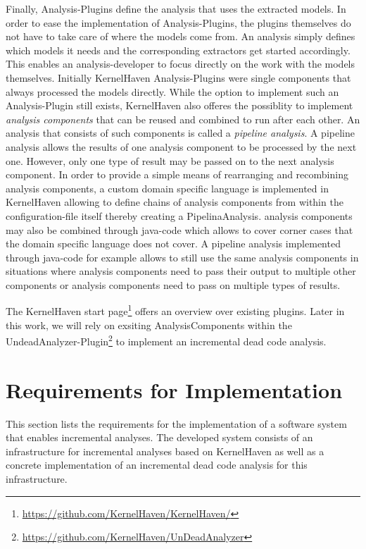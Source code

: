\documentclass[a4paper]{article}
\begin{document}
Finally, Analysis-Plugins define the analysis that uses the extracted models. In order to ease the implementation of Analysis-Plugins, the plugins themselves do not have to take care of where the models come from. An analysis simply defines which models it needs and the corresponding extractors get started accordingly. This enables an analysis-developer to focus directly on the work with the models themselves. Initially KernelHaven Analysis-Plugins  were single components that always processed the models directly. While the option to implement such an Analysis-Plugin still exists, KernelHaven also offeres the possiblity to implement \emph{analysis components} that can be reused and combined to run after each other. An analysis that consists of such components is called a \emph{pipeline analysis}. A pipeline analysis allows the results of one analysis component to be processed by the next one.  However, only one type of result may be passed on to the next analysis component. In order to provide a simple means of rearranging and recombining analysis components, a custom domain specific language is implemented in KernelHaven allowing to define chains of analysis components from within the configuration-file itself thereby creating a PipelinaAnalysis. analysis components may also be combined through java-code which allows to cover corner cases that the domain specific language does not cover. A pipeline analysis implemented through java-code for example allows to still use the same analysis components in situations where  analysis components need to pass their output to multiple other components or analysis components need to pass on multiple types of results.

The KernelHaven start page\footnote{\url{https://github.com/KernelHaven/KernelHaven/}} offers an overview over existing plugins. Later in this work, we will rely on exsiting AnalysisComponents within the UndeadAnalyzer-Plugin\footnote{\url{https://github.com/KernelHaven/UnDeadAnalyzer}} to implement an incremental dead code analysis. 

\newpage
\section{Requirements for Implementation} \label{requirements}

This section lists the requirements for the implementation of a software system that enables incremental analyses. The developed system consists of an infrastructure for incremental analyses based on KernelHaven as well as a concrete implementation of an incremental dead code analysis for this infrastructure.
\end{document}
